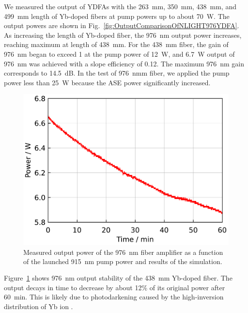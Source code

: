\documentclass{osa-article}
\begin{document}
We measured the output of YDFAs with the \SI{263}{mm}, \SI{350}{mm}, \SI{438}{mm}, and \SI{499}{mm} length of Yb-doped fibers at pump powers up to about \SI{70}{W}.
The output powers are shown in Fig.~\ref{fig:OutputComparisonOfNLIGHT976YDFA}.
As increasing the length of Yb-doped fiber, the \SI{976}{nm} output power increases, reaching maximum at length of \SI{438}{mm}.
For the \SI{438}{mm} fiber, the gain of \SI{976}{nm} began to exceed 1 at the pump power of \SI{12}{W}, and \SI{6.7}{W} output of \SI{976}{nm} was achieved with a slope efficiency of 0.12.
The maximum \SI{976}{nm} gain corresponds to \SI{14.5}{dB}.
In the test of \SI{976}{nmm} fiber, we applied the pump power less than \SI{25}{W} because the ASE power significantly increased.

\begin{figure}[h!]
  \centering
  \begin{minipage}[b]{0.5\linewidth}
    \centering
    \includegraphics[keepaspectratio, width=0.9\linewidth]{./Figure/Yb1200-20-125DC-PM438mm_LongTermStability_915Pump70W976Seed0.24W_Exp}
  \end{minipage}
  \caption{Measured output power of the \SI{976}{nm} fiber amplifier as a function of the launched \SI{915}{nm} pump power and results of the simulation.}
  \label{fig:LongTermStabilityOfNLIGHT976YDFA}
\end{figure}

Figure~\ref{fig:LongTermStabilityOfNLIGHT976YDFA} shows \SI{976}{nm} output stability of the \SI{438}{mm} Yb-doped fiber.
The output decays in time to decrease by about 12\% of its original power after \SI{60}{\minute}.
This is likely due to photodarkening caused by the high-inversion distribution of Yb ion \cite{jetschke2007Photodarkening}.
\end{document}
